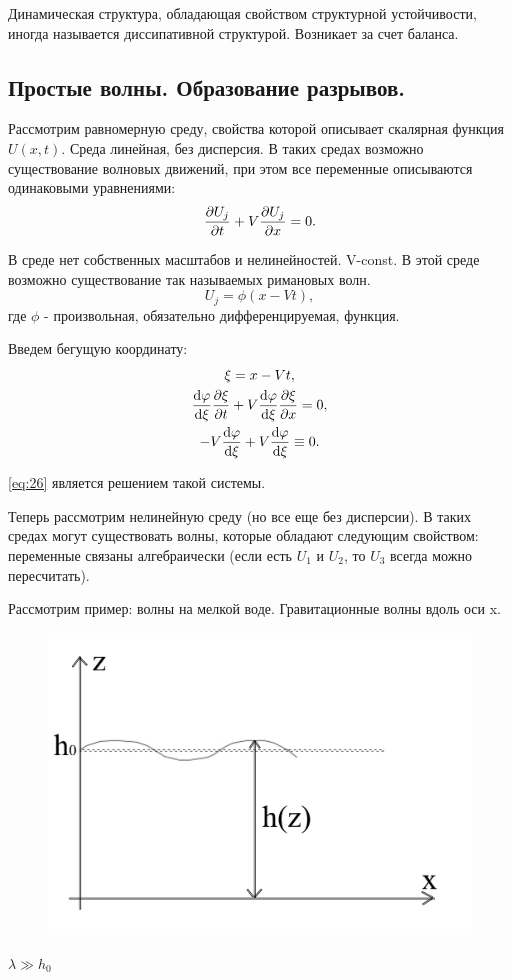 Динамическая структура, обладающая свойством структурной устойчивости, иногда называется диссипативной структурой. Возникает за счет баланса. 

\subsection{Простые волны. Образование разрывов.}
Рассмотрим равномерную среду, свойства которой описывает скалярная функция $U(x,t)$. Среда линейная, без дисперсия. В таких средах возможно существование волновых движений, при этом все переменные описываются одинаковыми уравнениями:
\begin{equation}
	\pdv{U_j}{t}+V\pdv{U_j}{x}=0.
	\label{eq:25}
\end{equation}

В среде нет собственных масштабов и нелинейностей. V-const. В этой среде возможно существование так называемых римановых волн. 
\begin{equation}
	U_j=\phi(x-Vt),
	\label{eq:26}
\end{equation}
где $\phi$ - произвольная, обязательно дифференцируемая, функция.

Введем бегущую координату:
\begin{gather*}
	\xi=x-Vt, \\ \dv{\varphi}{\xi} \pdv{\xi}{t}+V\dv{\varphi}{\xi} \pdv{\xi}{x}=0, \\ -V\dv{\varphi}{\xi}+V\dv{\varphi}{\xi} \equiv 0.
\end{gather*}

\eqref{eq:26} является решением такой системы. 

Теперь рассмотрим нелинейную среду (но все еще без дисперсии). В таких средах могут существовать волны, которые обладают следующим свойством: переменные связаны алгебраически (если есть $U_1$ и $U_2$, то $U_3$ всегда можно пересчитать).

Рассмотрим пример: волны на мелкой воде. Гравитационные волны вдоль оси x.
\begin{figure}[H]
	\centering
	\includegraphics[width=0.4\linewidth]{fig/fig11.pdf}   
\end{figure}
$\lambda \gg h_0$

